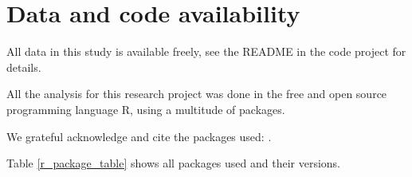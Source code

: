 \documentclass[USenglish]{article}
\begin{document}

\section{Data and code availability}
All data in this study is available freely, see the README in the code project for details.

All the analysis for this research project was done in the free and open source programming language R, using a multitude of packages. 

We grateful acknowledge and cite the packages used: .

Table \ref{r_package_table} shows all packages used and their versions.




\end{document}
